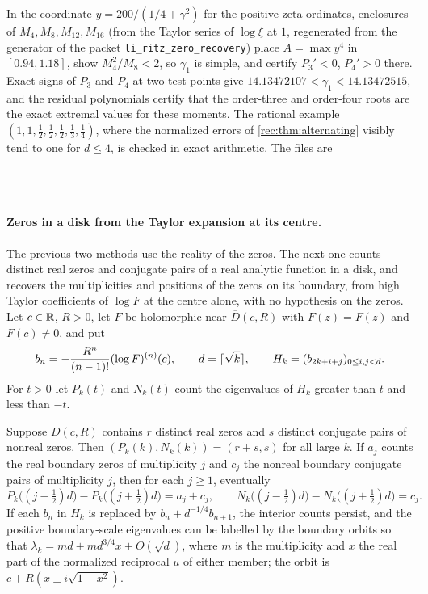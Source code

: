 \begin{example}\label{rec:ex:fourmoments}
In the coordinate $y=200/(1/4+\gamma^2)$ for the positive zeta ordinates, enclosures of
$M_4,M_8,M_{12},M_{16}$ (from the Taylor series of $\log\xi$ at $1$, regenerated from the generator
of the packet \texttt{li\_ritz\_zero\_recovery}) place $A=\max y^4$ in $[0.94,1.18]$, show
$M_4^2/M_8<2$, so $\gamma_1$ is simple, and certify $P_3'<0$, $P_4'>0$ there. Exact signs of $P_3$ and
$P_4$ at two test points give $14.13472107<\gamma_1<14.13472515$, and the residual polynomials
certify that the order-three and order-four roots are the exact extremal values for these moments.
The rational example $(1,1,\tfrac12,\tfrac12,\tfrac12,\tfrac13,\tfrac14)$, where the normalized
errors of \cref{rec:thm:alternating} visibly tend to one for $d\le4$, is checked in exact
arithmetic. The files are
\begin{center}
\\
\\
\end{center}
\end{example}

\paragraph{Zeros in a disk from the Taylor expansion at its centre.}
The previous two methods use the reality of the zeros. The next one counts distinct real zeros and
conjugate pairs of a real analytic function in a disk, and recovers the multiplicities and positions
of the zeros on its boundary, from high Taylor coefficients of $\log F$ at the centre alone, with no
hypothesis on the zeros. Let $c\in\mathbb{R}$, $R>0$, let $F$ be holomorphic near $\overline D(c,R)$ with
$\overline{F(\bar z)}=F(z)$ and $F(c)\ne0$, and put
\[
 b_n=-\frac{R^n}{(n-1)!}(\log F)^{(n)}(c),\qquad d=\lceil\sqrt k\rceil,\qquad H_k=(b_{2k+i+j})_{0\le i,j<d}.
\]
For $t>0$ let $P_k(t)$ and $N_k(t)$ count the eigenvalues of $H_k$ greater than $t$ and less than $-t$.

\begin{theorem}\label{rec:thm:census}
Suppose $D(c,R)$ contains $r$ distinct real zeros and $s$ distinct conjugate pairs of nonreal zeros.
Then $(P_k(k),N_k(k))=(r+s,s)$ for all large $k$. If $a_j$ counts the real boundary zeros of
multiplicity $j$ and $c_j$ the nonreal boundary conjugate pairs of multiplicity $j$, then for each
$j\ge1$, eventually
\[
 P_k\bigl((j-\tfrac12)d\bigr)-P_k\bigl((j+\tfrac12)d\bigr)=a_j+c_j,\qquad
 N_k\bigl((j-\tfrac12)d\bigr)-N_k\bigl((j+\tfrac12)d\bigr)=c_j .
\]
If each $b_n$ in $H_k$ is replaced by $b_n+d^{-1/4}b_{n+1}$, the interior counts persist, and the
positive boundary-scale eigenvalues can be labelled by the boundary orbits so that
$\lambda_k=md+md^{3/4}x+O(\sqrt d)$, where $m$ is the multiplicity and $x$ the real part of the
normalized reciprocal $u$ of either member; the orbit is $c+R(x\pm i\sqrt{1-x^2})$.
\end{theorem}

